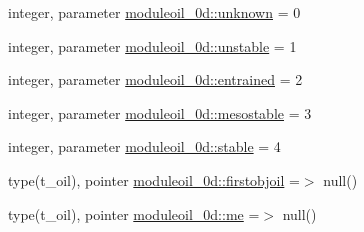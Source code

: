 \begin{DoxyCompactItemize}
\item 
integer, parameter \mbox{\hyperlink{namespacemoduleoil__0d_a094586a193a6fabfe6a9b25eea9c2fb9}{moduleoil\+\_\+0d\+::unknown}} = 0
\item 
integer, parameter \mbox{\hyperlink{namespacemoduleoil__0d_a8c7a38b47927f827a11f7650d63c5f7e}{moduleoil\+\_\+0d\+::unstable}} = 1
\item 
integer, parameter \mbox{\hyperlink{namespacemoduleoil__0d_ace1af42f0d06c1c6642bcd893ded460c}{moduleoil\+\_\+0d\+::entrained}} = 2
\item 
integer, parameter \mbox{\hyperlink{namespacemoduleoil__0d_aef2e8e2ad962beeb6bb5301b5888e0a4}{moduleoil\+\_\+0d\+::mesostable}} = 3
\item 
integer, parameter \mbox{\hyperlink{namespacemoduleoil__0d_a9633b81c847d2725723582f29faf373b}{moduleoil\+\_\+0d\+::stable}} = 4
\item 
type(t\+\_\+oil), pointer \mbox{\hyperlink{namespacemoduleoil__0d_ac5073a09d38699166168d1fd88087a70}{moduleoil\+\_\+0d\+::firstobjoil}} =$>$ null()
\item 
type(t\+\_\+oil), pointer \mbox{\hyperlink{namespacemoduleoil__0d_acc4a1700e48af3af5e8087197b74d450}{moduleoil\+\_\+0d\+::me}} =$>$ null()
\end{DoxyCompactItemize}
